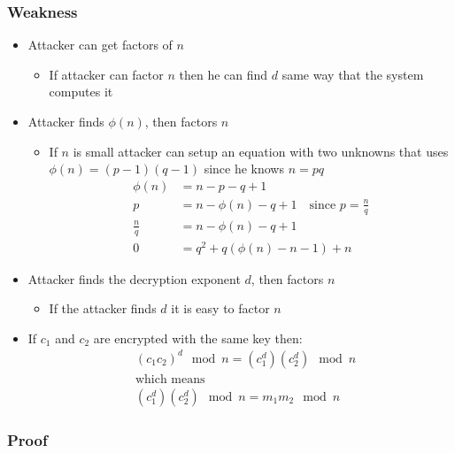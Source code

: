 \subsubsection*{Weakness}
\begin{itemize}
\item Attacker can get factors of $n$
  \begin{itemize}
  \item If attacker can factor $n$ then he can find $d$ same way that
    the system computes it
  \end{itemize}
\item Attacker finds $\phi (n)$, then factors $n$
  \begin{itemize}
  \item If $n$ is small attacker can setup an equation with two unknowns
    that uses $\phi (n)=(p-1)(q-1)$ since he knows $n=pq$
    \begin{align*}
      \phi(n) &= n - p - q + 1 \\
      p &= n - \phi(n) - q + 1 \quad \text{since } p = \frac{n}{q} \\
      \frac{n}{q} &= n - \phi(n) - q + 1 \\
      0 &= q^2 + q(\phi(n) - n - 1) + n
    \end{align*}
  \end{itemize}
\item Attacker finds the decryption exponent $d$, then factors $n$
  \begin{itemize}
  \item If the attacker finds $d$ it is easy to factor $n$
  \end{itemize}
\item If $c_1$ and $c_2$ are encrypted with the same key then:
  \begin{align*}
    &(c_1c_2)^d \mod n = (c_1^d) (c_2^d) \mod n \\
    &\text{which means} \\
    &(c_1^d) (c_2^d) \mod n = m_1m_2 \mod n
  \end{align*}
\end{itemize}

\subsubsection*{Proof}

